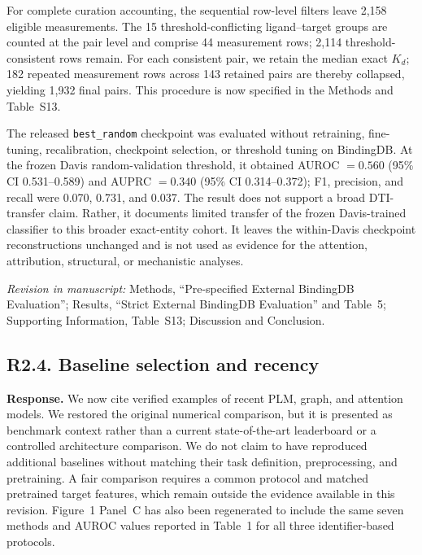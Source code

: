 \documentclass[11pt,a4paper]{article}
\newcommand{\response}{\noindent\textbf{Response.} }
\newcommand{\change}[1]{\par\smallskip\noindent\textit{Revision in manuscript:} #1\par\medskip}
\begin{document}
For complete curation accounting, the sequential row-level filters leave 2{,}158
eligible measurements. The 15 threshold-conflicting ligand--target groups are
counted at the pair level and comprise 44 measurement rows; 2{,}114
threshold-consistent rows remain. For each consistent pair, we retain the median
exact $K_d$; 182 repeated measurement rows across 143 retained pairs are thereby
collapsed, yielding 1{,}932 final pairs. This procedure is now specified in the
Methods and Table~S13.

The released \texttt{best\_random} checkpoint was evaluated without retraining,
fine-tuning, recalibration, checkpoint selection, or threshold tuning on
BindingDB. At the frozen Davis random-validation threshold, it obtained AUROC
$=0.560$ (95\% CI 0.531--0.589) and AUPRC $=0.340$ (95\% CI 0.314--0.372);
F1, precision, and recall were 0.070, 0.731, and 0.037. The result does not support a broad DTI-transfer claim.
Rather, it documents limited transfer of the frozen Davis-trained classifier to
this broader exact-entity cohort. It leaves the within-Davis
checkpoint reconstructions unchanged and is not used as evidence for the
attention, attribution, structural, or mechanistic analyses.

\change{Methods, ``Pre-specified External BindingDB Evaluation''; Results,
``Strict External BindingDB Evaluation'' and Table~5; Supporting Information,
Table~S13; Discussion and Conclusion.}

\subsection*{R2.4. Baseline selection and recency}


\response We now cite verified examples of recent PLM, graph, and attention
models. We restored the original numerical comparison, but it is presented as
benchmark context rather than a current state-of-the-art leaderboard or a
controlled architecture comparison. We do not claim to have reproduced
additional baselines without matching their task definition, preprocessing, and
pretraining. A fair comparison requires a common protocol and matched pretrained
target features, which remain outside the evidence available in this revision.
Figure~1 Panel~C has also been regenerated to include the same seven methods and
AUROC values reported in Table~1 for all three identifier-based protocols.
\end{document}
